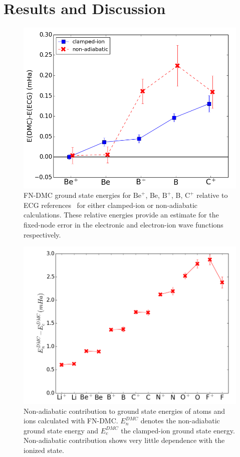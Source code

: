 \documentclass[pra,superscriptaddress,groupedaddress,twocolumn]{revtex4}
\begin{document}
\section{Results and Discussion}


\begin{figure}
\centering
\includegraphics[scale=.4]{Figures/atom-ECG}
\caption{FN-DMC ground state energies for $\text{Be}^+$, Be, $\text{B}^+$, B, $\text{C}^+$ relative to ECG references~\cite{Stanke_Be,Puchalski_Be+,Bubin_BeH_noBO,Bubin_B,Bubin_B+,Bubin_C+} for either clamped-ion or non-adiabatic calculations. These relative energies provide an estimate for the fixed-node error in the electronic and electron-ion wave functions respectively.\label{fig:atom-ECG}}
\end{figure}

\begin{figure}
\includegraphics[scale=.37]{Figures/atom-nad-ad}
\caption{Non-adiabatic contribution to ground state energies of atoms and ions calculated with FN-DMC. $E_n^{DMC}$ denotes the non-adiabatic ground state energy and $E_c^{DMC}$ the clamped-ion ground state energy. Non-adiabatic contribution shows very little dependence with the ionized state. \label{fig:atom-nad-ad}}
\end{figure}
\end{document}
